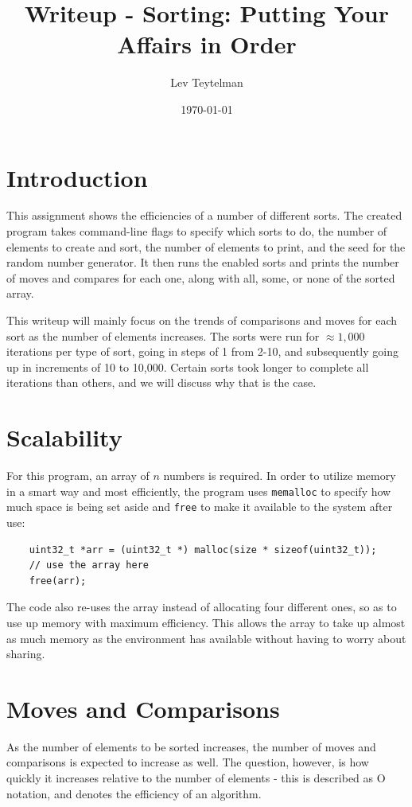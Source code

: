 \documentclass[12pt]{article}
\title{Writeup - Sorting: Putting Your Affairs in Order}
\author{Lev Teytelman}
\date{\today}
\begin{document}
\maketitle
\section{Introduction}
This assignment shows the efficiencies of a number of different sorts. The created program takes command-line flags to specify which sorts to do, the number of elements to create and sort, the number of elements to print, and the seed for the random number generator. It then runs the enabled sorts and prints the number of moves and compares for each one, along with all, some, or none of the sorted array.

This writeup will mainly focus on the trends of comparisons and moves for each sort as the number of elements increases. The sorts were run for $\approx1,000$ iterations per type of sort, going in steps of 1 from 2-10, and subsequently going up in increments of 10 to 10,000. Certain sorts took longer to complete all iterations than others, and we will discuss why that is the case.

\section{Scalability}
For this program, an array of $n$ numbers is required. In order to utilize memory in a smart way and most efficiently, the program uses \verb|memalloc| to specify how much space is being set aside and \verb|free| to make it available to the system after use:
\begin{verbatim}
    uint32_t *arr = (uint32_t *) malloc(size * sizeof(uint32_t));
    // use the array here
    free(arr);
\end{verbatim}
The code also re-uses the array instead of allocating four different ones, so as to use up memory with maximum efficiency. This allows the array to take up almost as much memory as the environment has available without having to worry about sharing.

\section{Moves and Comparisons}
As the number of elements to be sorted increases, the number of moves and comparisons is expected to increase as well. The question, however, is how quickly it increases relative to the number of elements - this is described as O notation, and denotes the efficiency of an algorithm.
\end{document}
